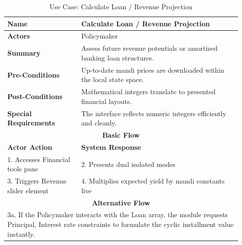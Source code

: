 \begin{table}[htbp]
  \centering
  \caption{Use Case: Calculate Loan / Revenue Projection}
  \label{uc:finance_tools}
  \begin{tabular}{|p{0.3\linewidth}|p{0.65\linewidth}|}
    \hline
    \textbf{Name} & Calculate Loan / Revenue Projection \\
    \hline
    \textbf{Actors} & Policymaker \\
    \hline
    \textbf{Summary} & Assess future revenue potentials or amortized banking loan structures. \\
    \hline
    \textbf{Pre-Conditions} & Up-to-date mandi prices are downloaded within the local state space. \\
    \hline
    \textbf{Post-Conditions} & Mathematical integers translate to presented financial layouts. \\
    \hline
    \textbf{Special Requirements} & The interface reflects numeric integers efficiently and cleanly. \\
    \hline
    \multicolumn{2}{|c|}{\textbf{Basic Flow}} \\
    \hline
    \textbf{Actor Action} & \textbf{System Response} \\
    \hline
    1. Accesses Financial tools pane & 2. Presents dual isolated modes \\
    3. Triggers Revenue slider element & 4. Multiplies expected yield by mandi constants live \\
    \hline
    \multicolumn{2}{|c|}{\textbf{Alternative Flow}} \\
    \hline
    \multicolumn{2}{|p{0.95\linewidth}|}{3a. If the Policymaker interacts with the Loan array, the module requests Principal, Interest rate constraints to formulate the cyclic installment value instantly.} \\
    \hline
  \end{tabular}
\end{table}

